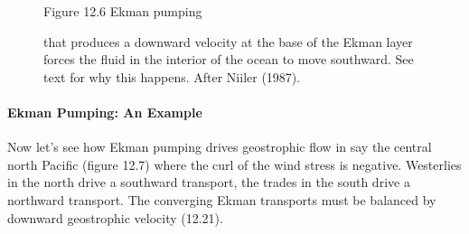 \begin{figure}[t]
{}
\footnotesize
Figure 12.6 Ekman pumping \rule{0pt}{2ex} that
produces a downward velocity at the base of the Ekman layer forces the
fluid in the interior of the ocean to move southward. See text for why
this happens. After Niiler (1987).

\label{fig:vorticity}
\vfill
\vspace{-3ex}
\end{figure}

\paragraph{Ekman Pumping: An Example}
Now let's see how Ekman pumping drives
geostrophic flow in say
the central north Pacific (figure 12.7) where the curl of the wind
stress is negative. Westerlies in the north
drive a southward transport,
the trades in the south drive a northward
transport. The converging Ekman
transports must be balanced by downward geostrophic velocity (12.21).


